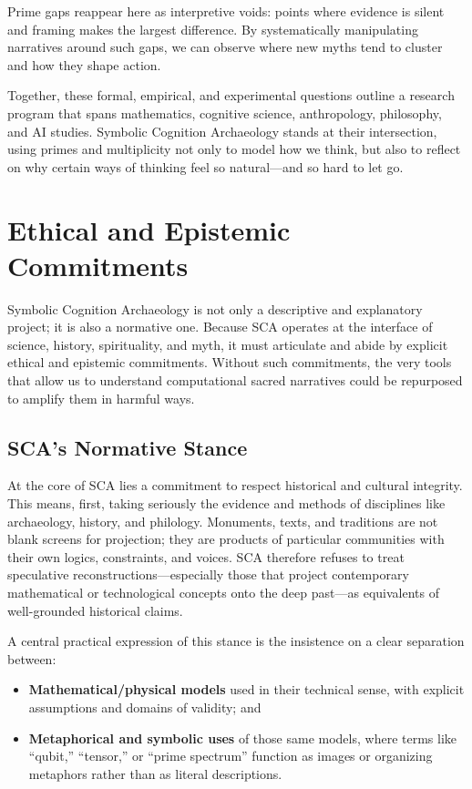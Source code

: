 \documentclass[12]{amsart}
\theoremstyle{plain}
\begin{document}
Prime gaps reappear here as interpretive voids: points where evidence is silent and framing makes the largest difference. By systematically manipulating narratives around such gaps, we can observe where new myths tend to cluster and how they shape action.

Together, these formal, empirical, and experimental questions outline a research program that spans mathematics, cognitive science, anthropology, philosophy, and AI studies. Symbolic Cognition Archaeology stands at their intersection, using primes and multiplicity not only to model how we think, but also to reflect on why certain ways of thinking feel so natural—and so hard to let go.


\section{Ethical and Epistemic Commitments}

Symbolic Cognition Archaeology is not only a descriptive and explanatory project; it is also a normative one. Because SCA operates at the interface of science, history, spirituality, and myth, it must articulate and abide by explicit ethical and epistemic commitments. Without such commitments, the very tools that allow us to understand computational sacred narratives could be repurposed to amplify them in harmful ways.

\subsection{SCA's Normative Stance}

At the core of SCA lies a commitment to respect historical and cultural integrity. This means, first, taking seriously the evidence and methods of disciplines like archaeology, history, and philology. Monuments, texts, and traditions are not blank screens for projection; they are products of particular communities with their own logics, constraints, and voices. SCA therefore refuses to treat speculative reconstructions—especially those that project contemporary mathematical or technological concepts onto the deep past—as equivalents of well-grounded historical claims.

A central practical expression of this stance is the insistence on a clear separation between:

\begin{itemize}
  \item \textbf{Mathematical/physical models} used in their technical sense, with explicit assumptions and domains of validity; and
  \item \textbf{Metaphorical and symbolic uses} of those same models, where terms like ``qubit,'' ``tensor,'' or ``prime spectrum'' function as images or organizing metaphors rather than as literal descriptions.
\end{itemize}
\end{document}

